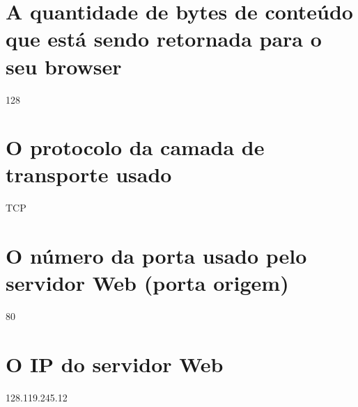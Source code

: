 \begin{parts}
    \part{A quantidade de bytes de conteúdo que está sendo retornada para o seu browser}
    \begin{solution}
    128
    \end{solution}

    \part{O protocolo da camada de transporte usado}
    \begin{solution}
    TCP
    \end{solution}

    \part{O número da porta usado pelo servidor Web (porta origem)}
    \begin{solution}
    80
    \end{solution}

    \part{O IP do servidor Web}
    \begin{solution}
    128.119.245.12
    \end{solution}
\end{parts}